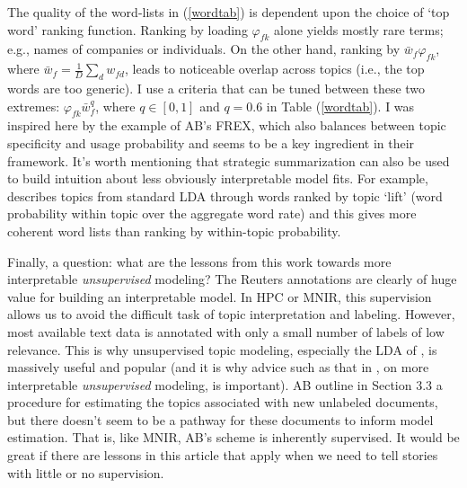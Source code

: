 \documentclass[12pt]{article}
\begin{document}
The quality of the word-lists in (\ref{wordtab}) is dependent upon the choice of `top word' ranking function.  Ranking by loading $\varphi_{fk}$ alone  yields mostly rare terms; e.g., names of companies or individuals.  On the other hand, ranking by ${\bar w}_f\varphi_{fk}$, where ${\bar w}_f = \tfrac{1}{D}\sum_d w_{fd}$, leads to noticeable overlap across topics (i.e., the top words are too generic).  I use a criteria that can be tuned between these two extremes: $\varphi_{fk}{\bar w}_f^q$, where $q \in [0,1]$ and $q=0.6$ in Table (\ref{wordtab}). I was inspired here by the example of AB's FREX, which also balances between topic specificity and usage probability and seems to be a key ingredient in their framework.   It's worth mentioning that strategic  summarization can also be used to build intuition about less obviously interpretable model fits.  For example, \cite{taddy_estimation_2012} describes topics from standard LDA through words ranked by topic `lift' (word probability within topic over the aggregate word rate) and this gives more coherent word lists than ranking by within-topic probability.

Finally, a question: what are the lessons from this work
towards more interpretable {\it unsupervised} modeling? The Reuters
annotations are clearly of huge value for building an interpretable model.
In HPC or MNIR,  this supervision allows us to avoid the
difficult task of topic interpretation and labeling.  However, most available
text data is annotated with only a small number of labels of low relevance.
This is why unsupervised topic modeling, especially the LDA of
\cite{blei2012probabilistic}, is massively useful and popular (and it is why advice such as that in \citealt{wallach_rethinking_2009}, on more interpretable {\it unsupervised} modeling, is important). AB
outline in Section 3.3 a procedure for estimating the topics associated with
new  unlabeled documents, but there doesn't seem to be a pathway for these
documents to inform model estimation.  That is, like MNIR, AB's
scheme is inherently supervised.  It would be great if there are lessons in
this article that apply when we need to tell stories with little or no supervision.

\small


\end{document}

